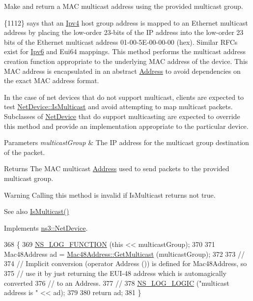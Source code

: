 Make and return a M\+AC multicast address using the provided multicast group. 

\{1112\} says that an \hyperlink{classns3_1_1Ipv4}{Ipv4} host group address is mapped to an Ethernet multicast address by placing the low-\/order 23-\/bits of the IP address into the low-\/order 23 bits of the Ethernet multicast address 01-\/00-\/5\+E-\/00-\/00-\/00 (hex). Similar R\+F\+Cs exist for \hyperlink{classns3_1_1Ipv6}{Ipv6} and Eui64 mappings. This method performs the multicast address creation function appropriate to the underlying M\+AC address of the device. This M\+AC address is encapsulated in an abstract \hyperlink{classns3_1_1Address}{Address} to avoid dependencies on the exact M\+AC address format.

In the case of net devices that do not support multicast, clients are expected to test \hyperlink{classns3_1_1NetDevice_a1afb4848a9226540f1ff51f9b31ae95e}{Net\+Device\+::\+Is\+Multicast} and avoid attempting to map multicast packets. Subclasses of \hyperlink{classns3_1_1NetDevice}{Net\+Device} that do support multicasting are expected to override this method and provide an implementation appropriate to the particular device.


\begin{DoxyParams}{Parameters}
{\em multicast\+Group} & The IP address for the multicast group destination of the packet. \\
\hline
\end{DoxyParams}
\begin{DoxyReturn}{Returns}
The M\+AC multicast \hyperlink{classns3_1_1Address}{Address} used to send packets to the provided multicast group.
\end{DoxyReturn}
\begin{DoxyWarning}{Warning}
Calling this method is invalid if Is\+Multicast returns not true. 
\end{DoxyWarning}
\begin{DoxySeeAlso}{See also}
\hyperlink{classns3_1_1McUeNetDevice_a3459253818df16ee6af2ba49c28c525d}{Is\+Multicast()} 
\end{DoxySeeAlso}


Implements \hyperlink{classns3_1_1NetDevice_a98aa4852df367b6a393c8cc1d88af0d9}{ns3\+::\+Net\+Device}.


\begin{DoxyCode}
368 \{
369   \hyperlink{log-macros-disabled_8h_a90b90d5bad1f39cb1b64923ea94c0761}{NS\_LOG\_FUNCTION} (\textcolor{keyword}{this} << multicastGroup);
370 
371   Mac48Address ad = \hyperlink{classns3_1_1Mac48Address_a23d170f8c7a7d90a8110425620285819}{Mac48Address::GetMulticast} (multicastGroup);
372 
373   \textcolor{comment}{//}
374   \textcolor{comment}{// Implicit conversion (operator Address ()) is defined for Mac48Address, so}
375   \textcolor{comment}{// use it by just returning the EUI-48 address which is automagically converted}
376   \textcolor{comment}{// to an Address.}
377   \textcolor{comment}{//}
378   \hyperlink{group__logging_ga88acd260151caf2db9c0fc84997f45ce}{NS\_LOG\_LOGIC} (\textcolor{stringliteral}{"multicast address is "} << ad);
379 
380   \textcolor{keywordflow}{return} ad;
381 \}
\end{DoxyCode}


